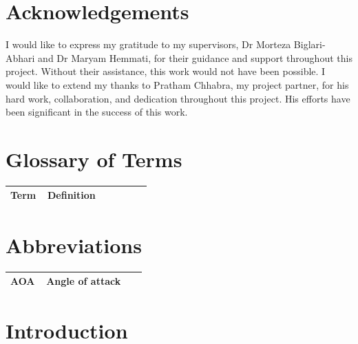 \documentclass[12pt, a4paper, ukenglish]{article}
\begin{document}
\section*{Acknowledgements}

\label{sec:Acknowledgements1}
I would like to express my gratitude to my supervisors, Dr Morteza Biglari-Abhari and Dr Maryam Hemmati, for their guidance and support throughout this project. Without their assistance, this work would not have been possible. 
\newline \newline
I would like to extend my thanks to Pratham Chhabra, my project partner, for his hard work, collaboration, and dedication throughout this project. His efforts have been significant in the success of this work.

\newpage

\section*{Glossary of Terms}

\begin{longtable}{p{0.25\linewidth} p{0.70\linewidth}}
    \toprule
    \textbf{Term} & \textbf{Definition} \\
    \midrule
    \endhead
    \bottomrule
\end{longtable}
\addtocounter{table}{-1}

\section*{Abbreviations}

\begin{longtable}{p{0.25\linewidth} p{0.70\linewidth}}
    \toprule
    \textbf{AOA} & \textbf{Angle of attack} \\
    \midrule
    \endhead
    \bottomrule
\end{longtable}
\addtocounter{table}{-1}

\printnomenclature

\clearpage
\setlength{\parskip}{9pt}
\section{Introduction} \label{sec: intro}
\end{document}
